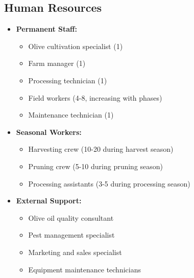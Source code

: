 \subsection{Human Resources}
\begin{itemize}
    \item \textbf{Permanent Staff:}
    \begin{itemize}
        \item Olive cultivation specialist (1)
        \item Farm manager (1)
        \item Processing technician (1)
        \item Field workers (4-8, increasing with phases)
        \item Maintenance technician (1)
    \end{itemize}
    \item \textbf{Seasonal Workers:}
    \begin{itemize}
        \item Harvesting crew (10-20 during harvest season)
        \item Pruning crew (5-10 during pruning season)
        \item Processing assistants (3-5 during processing season)
    \end{itemize}
    \item \textbf{External Support:}
    \begin{itemize}
        \item Olive oil quality consultant
        \item Pest management specialist
        \item Marketing and sales specialist
        \item Equipment maintenance technicians
    \end{itemize}
\end{itemize}

